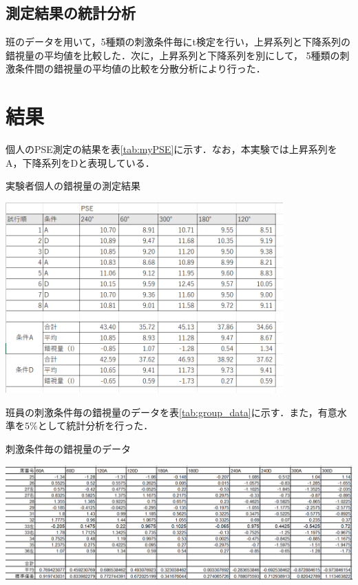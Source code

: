 \documentclass{jlreq}
\numberwithin{equation}{section}
\begin{document}
\subsection{測定結果の統計分析}
班のデータを用いて，5種類の刺激条件毎にt検定を行い，上昇系列と下降系列の錯視量の平均値を比較した．次に，上昇系列と下降系列を別にして，
5種類の刺激条件間の錯視量の平均値の比較を分散分析により行った．

\section{結果}
個人のPSE測定の結果を表\ref{tab:myPSE}に示す．なお，本実験では上昇系列をA，下降系列をDと表現している．

\begin{table}[H]
  \centering
  \caption{実験者個人の錯視量の測定結果}
  \includegraphics[width=0.8\textwidth]{image/myPSE.png}
  \label{tab:myPSE}
\end{table}

班員の刺激条件毎の錯視量のデータを表\ref{tab:group_data}に示す．また，有意水準を$5\si{\percent}$として統計分析を行った．
\begin{table}[H]
  \centering
  \caption{刺激条件毎の錯視量のデータ}
  \includegraphics[width=\textwidth]{image/錯視量_班員データ.png}
  \label{tab:group_data}
\end{table}
\end{document}
